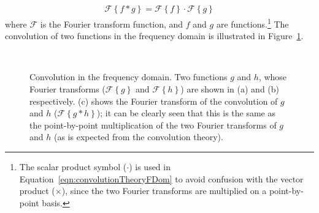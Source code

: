 \begin{align}
\mathcal{F}\left\{f \ast g\right\} = \mathcal{F}\left\{f\right\} \cdot \mathcal{F}\left\{g\right\} \label{eqn:convolutionTheoryFDom}
\end{align}
where $\mathrm{\mathcal{F}}$ is the Fourier transform function, and $f$ and $g$ are functions.\footnote{The scalar product symbol ($\cdot$) is used in Equation~\ref{eqn:convolutionTheoryFDom} to avoid confusion with the vector product ($\times$), since the two Fourier transforms are multiplied on a point-by-point basis.} The convolution of two functions in the frequency domain is illustrated in Figure~\ref{fig:convolution_freq}.
\begin{figure}[t]
\begin{center}
\\
\caption[Convolution in the frequency domain.]{Convolution in the frequency domain. Two functions $g$ and $h$, whose Fourier transforms ($\mathcal{F}\left\{g\right\}$ and $\mathcal{F}\left\{h\right\}$) are shown in (a) and (b) respectively. (c) shows the Fourier transform of the convolution of $g$ and $h$ ($\mathcal{F}\left\{g \ast h\right\}$); it can be clearly seen that this is the same as the point-by-point multiplication of the two Fourier transforms of $g$ and $h$ (as is expected from the convolution theory).}
\label{fig:convolution_freq}
\end{center}
\end{figure}
%
